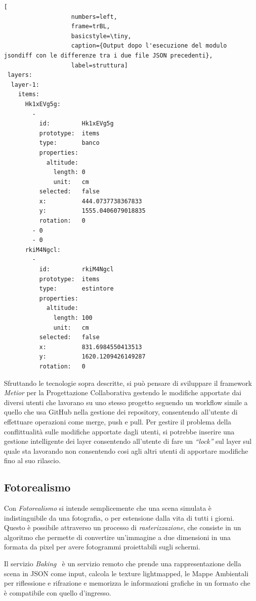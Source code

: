 \begin{lstlisting}[
                   numbers=left,
                   frame=trBL,
                   basicstyle=\tiny,
                   caption={Output dopo l'esecuzione del modulo jsondiff con le differenze tra i due file JSON precedenti},
                   label=struttura]
 layers:
  layer-1:
    items:
      Hk1xEVg5g:
        -
          id:         Hk1xEVg5g
          prototype:  items
          type:       banco
          properties:
            altitude:
              length: 0
              unit:   cm
          selected:   false
          x:          444.0737738367833
          y:          1555.0406079018835
          rotation:   0
        - 0
        - 0
      rkiM4Ngcl:
        -
          id:         rkiM4Ngcl
          prototype:  items
          type:       estintore
          properties:
            altitude:
              length: 100
              unit:   cm
          selected:   false
          x:          831.6984550413513
          y:          1620.1209426149287
          rotation:   0
\end{lstlisting}

Sfruttando le tecnologie sopra descritte, si può pensare di sviluppare il framework \emph{Metior}
per la Progettazione Collaborativa gestendo le modifiche apportate dai diversi utenti che lavorano su uno
stesso progetto seguendo un workflow simile a quello che usa GitHub nella gestione dei repository,
consentendo all'utente di effettuare operazioni come merge, push e pull.
Per gestire il problema della conflittualità sulle modifiche apportate dagli utenti,
si potrebbe inserire una gestione intelligente dei layer consentendo all'utente di fare un \emph{``lock''} sul layer sul quale
sta lavorando non consentendo cosi agli altri utenti di apportare modifiche fino al suo rilascio.
\newpage

\subsection{Fotorealismo}
\label{sec:conclusions_section_2_sub_3}
Con \emph{Fotorealismo} si intende semplicemente che una scena simulata \`e indistinguibile da una fotografia, o per estensione
dalla vita di tutti i giorni. Questo è possibile attraverso un processo di \emph{rasterizzazione}, che consiste in un algoritmo che
permette di convertire un'immagine a due dimensioni in una formata da pixel per avere fotogrammi proiettabili sugli schermi.

Il servizio \emph{Baking}~\cite{baking} \`e un servizio remoto che prende una rappresentazione della scena in JSON come input,
calcola le texture lightmapped, le Mappe Ambientali per riflessione e rifrazione e memorizza le informazioni grafiche
in un formato che \`e compatibile con quello d'ingresso.\\

